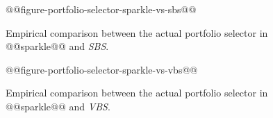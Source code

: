 \documentclass[british]{article}
\begin{document}
\begin{figure}[t]
\noindent \begin{centering}
@@figure-portfolio-selector-sparkle-vs-sbs@@
\par\end{centering}

\caption{Empirical comparison between the actual portfolio selector in @@sparkle@@ and \emph{SBS}.}\label{fig:sparkle_vs_sbs}
\end{figure}

\begin{figure}[t]
\noindent \begin{centering}
@@figure-portfolio-selector-sparkle-vs-vbs@@
\par\end{centering}

\caption{Empirical comparison between the actual portfolio selector in @@sparkle@@ and \emph{VBS}.}\label{fig:sparkle_vs_vbs}
\end{figure}





\end{document}
